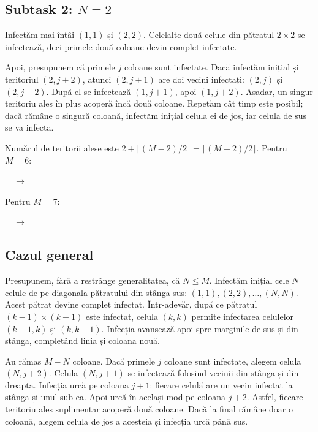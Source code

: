 \subsection*{Subtask 2: $N=2$}

Infectăm mai întâi $(1,1)$ și $(2,2)$. Celelalte două celule din pătratul $2\times2$ se infectează, deci primele două coloane devin complet infectate.

Apoi, presupunem că primele $j$ coloane sunt infectate. Dacă infectăm inițial și teritoriul $(2,j+2)$, atunci $(2,j+1)$ are doi vecini infectați: $(2,j)$ și $(2,j+2)$. După el se infectează $(1,j+1)$, apoi $(1,j+2)$. Așadar, un singur teritoriu ales în plus acoperă încă două coloane. Repetăm cât timp este posibil; dacă rămâne o singură coloană, infectăm inițial celula ei de jos, iar celula de sus se va infecta.

Numărul de teritorii alese este $2+\lceil(M-2)/2\rceil=\lceil(M+2)/2\rceil$. Pentru $M=6$:
\begin{center}
    \(\quad\longrightarrow\quad\)
\end{center}

Pentru $M = 7$:
\begin{center}
    \(\quad\longrightarrow\quad\)
\end{center}

\subsection*{Cazul general}


Presupunem, fără a restrânge generalitatea, că $N\leq M$. Infectăm inițial cele $N$ celule de pe diagonala pătratului din stânga sus: $(1,1),(2,2),\ldots,(N,N)$. Acest pătrat devine complet infectat. Într-adevăr, după ce pătratul $(k-1)\times(k-1)$ este infectat, celula $(k,k)$ permite infectarea celulelor $(k-1,k)$ și $(k,k-1)$. Infecția avansează apoi spre marginile de sus și din stânga, completând linia și coloana nouă.

Au rămas $M-N$ coloane. Dacă primele $j$ coloane sunt infectate, alegem celula $(N,j+2)$. Celula $(N,j+1)$ se infectează folosind vecinii din stânga și din dreapta. Infecția urcă pe coloana $j+1$: fiecare celulă are un vecin infectat la stânga și unul sub ea. Apoi urcă în același mod pe coloana $j+2$. Astfel, fiecare teritoriu ales suplimentar acoperă două coloane. Dacă la final rămâne doar o coloană, alegem celula de jos a acesteia și infecția urcă până sus.

